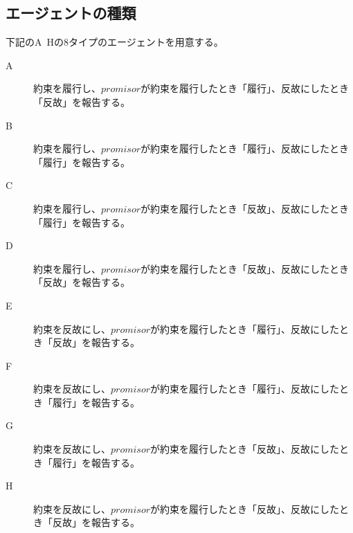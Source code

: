 \subsection{エージェントの種類}
下記のA~Hの8タイプのエージェントを用意する。
\begin{description}
  \item [A] 約束を履行し、$promisor$が約束を履行したとき「履行」、反故にしたとき「反故」を報告する。
  \item [B] 約束を履行し、$promisor$が約束を履行したとき「履行」、反故にしたとき「履行」を報告する。
  \item [C] 約束を履行し、$promisor$が約束を履行したとき「反故」、反故にしたとき「履行」を報告する。
  \item [D] 約束を履行し、$promisor$が約束を履行したとき「反故」、反故にしたとき「反故」を報告する。
  \item [E] 約束を反故にし、$promisor$が約束を履行したとき「履行」、反故にしたとき「反故」を報告する。
  \item [F] 約束を反故にし、$promisor$が約束を履行したとき「履行」、反故にしたとき「履行」を報告する。
  \item [G] 約束を反故にし、$promisor$が約束を履行したとき「反故」、反故にしたとき「履行」を報告する。
  \item [H] 約束を反故にし、$promisor$が約束を履行したとき「反故」、反故にしたとき「反故」を報告する。
\end{description}

